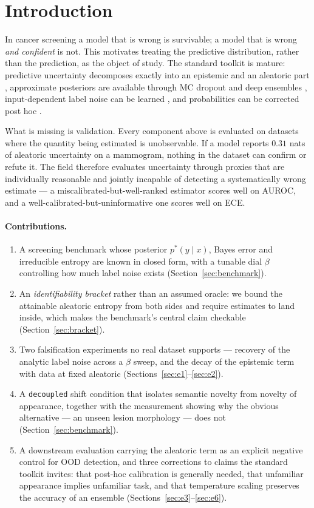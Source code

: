 \documentclass{article}
\begin{document}
\section{Introduction}

In cancer screening a model that is wrong is survivable; a model that is wrong
\emph{and confident} is not. This motivates treating the predictive distribution,
rather than the prediction, as the object of study. The standard toolkit is
mature: predictive uncertainty decomposes exactly into an epistemic and an
aleatoric part \citep{houlsby2011bald, depeweg2018decomposition}, approximate
posteriors are available through MC dropout \citep{gal2016dropout} and deep
ensembles \citep{lakshminarayanan2017ensembles}, input-dependent label noise can
be learned \citep{kendall2017uncertainties}, and probabilities can be corrected
post hoc \citep{guo2017calibration}.

What is missing is validation. Every component above is evaluated on datasets
where the quantity being estimated is unobservable. If a model reports
$0.31$ nats of aleatoric uncertainty on a mammogram, nothing in the dataset can
confirm or refute it. The field therefore evaluates uncertainty through proxies
that are individually reasonable and jointly incapable of detecting a
systematically wrong estimate --- a miscalibrated-but-well-ranked estimator
scores well on AUROC, and a well-calibrated-but-uninformative one scores well on
ECE.

\paragraph{Contributions.}
\begin{enumerate}\itemsep2pt
\item A screening benchmark whose posterior $p^*(y \mid x)$, Bayes error and
irreducible entropy are known in closed form, with a tunable dial $\beta$
controlling how much label noise exists (Section~\ref{sec:benchmark}).
\item An \emph{identifiability bracket} rather than an assumed oracle: we bound
the attainable aleatoric entropy from both sides and require estimates to land
inside, which makes the benchmark's central claim checkable
(Section~\ref{sec:bracket}).
\item Two falsification experiments no real dataset supports --- recovery of the
analytic label noise across a $\beta$ sweep, and the decay of the epistemic term
with data at fixed aleatoric (Sections~\ref{sec:e1}--\ref{sec:e2}).
\item A \texttt{decoupled} shift condition that isolates semantic novelty from
novelty of appearance, together with the measurement showing why the obvious
alternative --- an unseen lesion morphology --- does not (Section~\ref{sec:benchmark}).
\item A downstream evaluation carrying the aleatoric term as an explicit negative
control for OOD detection, and three corrections to claims the standard toolkit
invites: that post-hoc calibration is generally needed, that unfamiliar
appearance implies unfamiliar task, and that temperature scaling preserves the
accuracy of an ensemble (Sections~\ref{sec:e3}--\ref{sec:e6}).
\end{enumerate}
\end{document}
